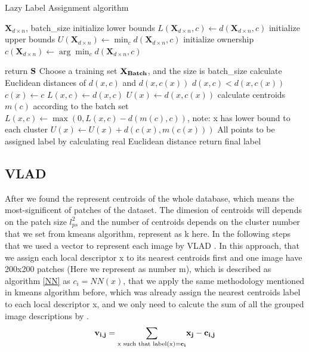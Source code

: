 \documentclass[final,leqno,onefignum,onetabnum]{siamltexmm}
\newcommand{\argmin}{\arg\!\min}
\begin{document}
\begin{algorithm}[H]
	\caption{Lazy Label Assignment algorithm}
	\label{LazyLabel}
	\begin{algorithmic}[1]
		 {$\textbf{X}_{d \times n}$, batch\_size}
		\State initialize lower bounds $L(\textbf{X}_{d \times n},c) \leftarrow d(\textbf{X}_{d \times n},c)$
		\State initialize upper bounds $U(\textbf{X}_{d \times n}) \leftarrow \min_c d(\textbf{X}_{d \times n},c)$
		\State initialize ownership $c(\textbf{X}_{d \times n}) \leftarrow \argmin_c d(\textbf{X}_{d \times n},c)$
		
		\State return $\bf{S}$
		\EndIf
		\State Choose a training set $\bf{X}_{Batch}$, and the size is batch\_size
		\State calculate Euclidean distances of $d(x,c)$ and $d(x,c(x))$
		\If $d(x,c) < d(x,c(x))$
		\State $c(x) \leftarrow c$
		\EndIf
		\State $L(x,c) \leftarrow d(x,c)$
		\State $U(x) \leftarrow d(x,c(x))$
		\EndIf
		\EndFor
		\State calculate centroids $m(c)$ according to the batch set
		\State $L(x,c) \leftarrow \max(0, L(x,c) - d(m(c), c))$, note: x has lower bound to each cluster
		\State $U(x) \leftarrow U(x) + d(c(x), m(c(x)))$
		\EndFor
		\EndFor 
		\State All points to be assigned label by calculating real Euclidean distance
		\State return final label
		\EndProcedure
	\end{algorithmic}
\end{algorithm}

\subsection {VLAD}
After we found the represent centroids of the whole database, which means the most-significent of patches of the dataset. The dimesion of centroids will depends on the patch size $l_{ps}^2$ and the number of centroids depends on the cluster number that we set from kmeans algorithm, represent as k here. In the following steps that we used a vector to represent each image by VLAD \cite{vlad}. In this approach, that we assign each local descriptor x to its nearest centroids first and one image have 200x200 patches (Here we represent as number m), which is described as algorithm \ref{NN} as $c_i = NN(x)$, that we apply the same methodology mentioned in kmeans algorithm before, which was already assign the nearest centroids label to each local descriptor x, and we only need to calcute the sum of all the grouped image descriptions by . 
\begin {equation}\label{nn_sum}
\bf{v_{i,j}} = \bf{\sum\limits_{\text{x such that label(x)} = c_i}}{x_j-c_{i,j}}
\end {equation}
\end{document}
